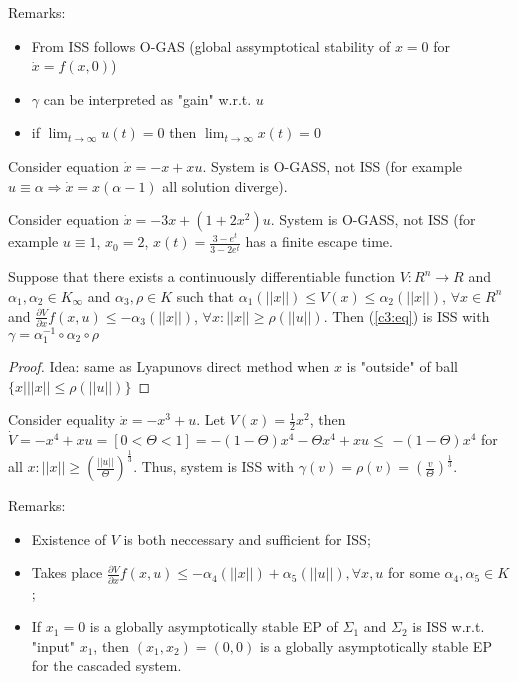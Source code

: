 Remarks:

\begin{itemize}
 \item From ISS follows O-GAS (global assymptotical stability of $x=0$ for
   $\dot x=f(x,0)$)
 \item $\gamma$ can be interpreted as "gain" w.r.t. $u$
 \item if $\lim_{t\to\infty} u(t)=0$ then $\lim_{t \to\infty}x(t)=0$
\end{itemize}

\begin{Example}
 Consider equation $\dot x = -x+xu$. System is O-GASS, not ISS (for example
 $u\equiv\alpha \Rightarrow \dot x = x (\alpha-1)$ all solution diverge).
\end{Example}

\begin{Example}
 Consider equation $\dot x =-3x+(1+2x^2)u$. System is O-GASS, not ISS (for example 
 $u\equiv1$, $x_0=2$, $x(t)=\frac{3-e^{t}}{3-2e^{t}}$ has a finite escape time.
\end{Example}

\begin{Theorem}
 Suppose that there exists a continuously differentiable function 
 $V:R^n\to R$ and $\alpha_1,\alpha_2\in K_\infty$ and $\alpha_3, \rho \in K$
 such that $\alpha_1(||x||)\le V(x)\le\alpha_2(||x||)$, $\forall x\in R^n$ and
 $\frac{\partial V}{\partial x}f(x,u)\le-\alpha_3(||x||)$,
 $\forall x: ||x||\ge\rho(||u||)$. Then (\ref{c3:eq}) is ISS with 
 $\gamma = \alpha_1^{-1} \circ \alpha_2\circ\rho$

 \begin{proof}
 Idea: same as Lyapunovs direct method when $x$ is "outside" of ball
 $\{x | ||x||\le\rho(||u||)\}$
 \end{proof}
\end{Theorem}


\begin{Example}
 Consider equality $\dot x = -x^3+u$. Let $V(x)=\frac{1}{2}x^2$, then
 $\dot V = -x^4+xu=[0<\Theta<1]=-(1-\Theta)x^4-\Theta x^4+xu\le$
 $-(1-\Theta)x^4$ for all $x: ||x||\ge\left(\frac{||u||}{\Theta}\right)^\frac{1}{3}$.
 Thus, system is ISS with 
 $\gamma(v)=\rho(v)=\left(\frac{v}{\Theta}\right)^\frac{1}{3}$.
\end{Example}


Remarks:
\begin{itemize}
 \item Existence of $V$ is both neccessary and sufficient for ISS;
 \item Takes place $\frac{\partial V}{\partial x}f(x,u) \le -\alpha_4(||x||)+\alpha_5(||u||), \forall x,u$ for some $\alpha_4,\alpha_5\in K$;
 \item 
  If $x_1=0$ is a globally asymptotically stable EP of $\Sigma_1$ and $\Sigma_2$ is ISS w.r.t. "input" $x_1$, then $(x_1,x_2)=(0,0)$ is a globally asymptotically stable EP for the cascaded system.
\end{itemize}

